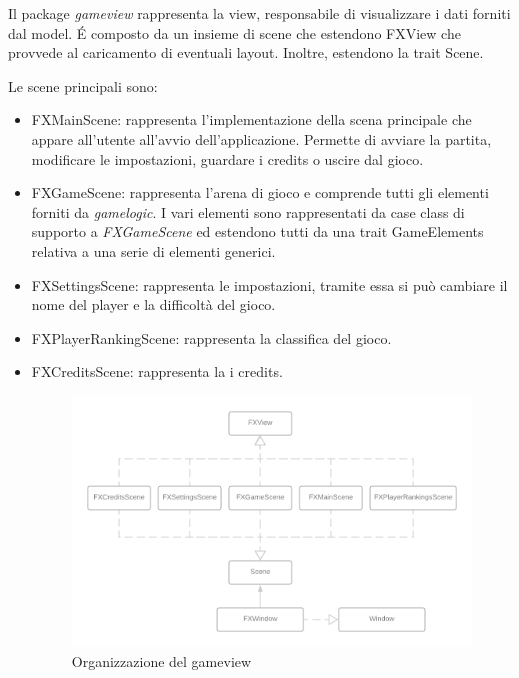 Il package \textit{gameview} rappresenta la view, responsabile di visualizzare i dati forniti dal model. 
\'E composto da un insieme di scene che estendono FXView che provvede al caricamento di eventuali layout. Inoltre, estendono la trait Scene.

Le scene principali sono:
\begin{itemize}
    \item FXMainScene: rappresenta l'implementazione della scena principale che appare all'utente all'avvio dell'applicazione. Permette di avviare la partita, modificare le impostazioni, guardare i credits o uscire dal gioco.
    \item FXGameScene: rappresenta l'arena di gioco e comprende tutti gli elementi forniti da \textit{gamelogic}. I vari elementi sono rappresentati da case class di supporto a \textit{FXGameScene} ed estendono tutti da una trait GameElements relativa a una serie di elementi generici.
    \item FXSettingsScene: rappresenta le impostazioni, tramite essa si può cambiare il nome del player e la difficoltà del gioco.
    \item FXPlayerRankingScene: rappresenta la classifica del gioco.
    \item FXCreditsScene: rappresenta la i credits.
    
    \begin{figure}[H]
    \centering
      \includegraphics[width=14cm]{res/Scene_Diagram.png}
      \caption{Organizzazione del gameview}
      \label{notifyAction}
    \end{figure}
    
\end{itemize}